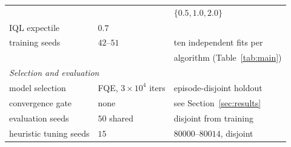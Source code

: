 \begin{table}[t]
\begin{tabular}{lll}
 & & $\{0.5, 1.0, 2.0\}$ \\
IQL expectile & $0.7$ & \\
training seeds & $42$--$51$ & ten independent fits per \\
 & & algorithm (Table~\ref{tab:main}) \\
\midrule
\multicolumn{3}{l}{\emph{Selection and evaluation}} \\
\midrule
model selection & FQE, $3\times10^4$ iters & episode-disjoint holdout \\
convergence gate & none & see Section~\ref{sec:results} \\
evaluation seeds & $50$ shared & disjoint from training \\
heuristic tuning seeds & $15$ & $80000$--$80014$, disjoint \\
\bottomrule
\end{tabular}
\end{table}

